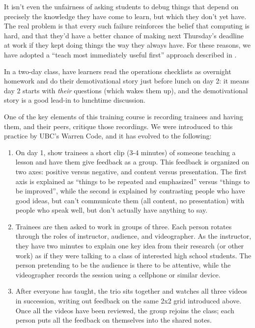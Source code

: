 It isn't even the unfairness of asking students to debug things that
depend on precisely the knowledge they have come to learn, but which
they don't yet have. The real problem is that every such failure
reinforces the belief that computing is hard, and that they'd have a
better chance of making next Thursday's deadline at work if they kept
doing things the way they always have. For these reasons, we have
adopted a ``teach most immediately useful first'' approach described
in .


In a two-day class, have learners read the operations checklists as
overnight homework and do their demotivational story just before
lunch on day 2: it means day 2 starts with \emph{their} questions
(which wakes them up), and the demotivational story is a good
lead-in to lunchtime discussion.


One of the key elements of this training course is recording trainees
and having them, and their peers, critique those recordings. We were
introduced to this practice by UBC's Warren Code, and it has evolved to
the following:

\begin{enumerate}

\item
  On day 1, show trainees a short clip (3-4 minutes) of someone teaching
  a lesson and have them give feedback as a group. This feedback is
  organized on two axes: positive versus negative, and content versus
  presentation. The first axis is explained as ``things to be repeated
  and emphasized'' versus ``things to be improved'', while the second is
  explained by contrasting people who have good ideas, but can't
  communicate them (all content, no presentation) with people who speak
  well, but don't actually have anything to say.

\item
  Trainees are then asked to work in groups of three. Each person
  rotates through the roles of instructor, audience, and videographer.
  As the instructor, they have two minutes to explain one key idea from
  their research (or other work) as if they were talking to a class of
  interested high school students. The person pretending to be the
  audience is there to be attentive, while the videographer records the
  session using a cellphone or similar device.

\item
  After everyone has taught, the trio sits together and watches all
  three videos in succession, writing out feedback on the same 2x2 grid
  introduced above. Once all the videos have been reviewed, the group
  rejoins the class; each person puts all the feedback on themselves
  into the shared notes.

\end{enumerate}

